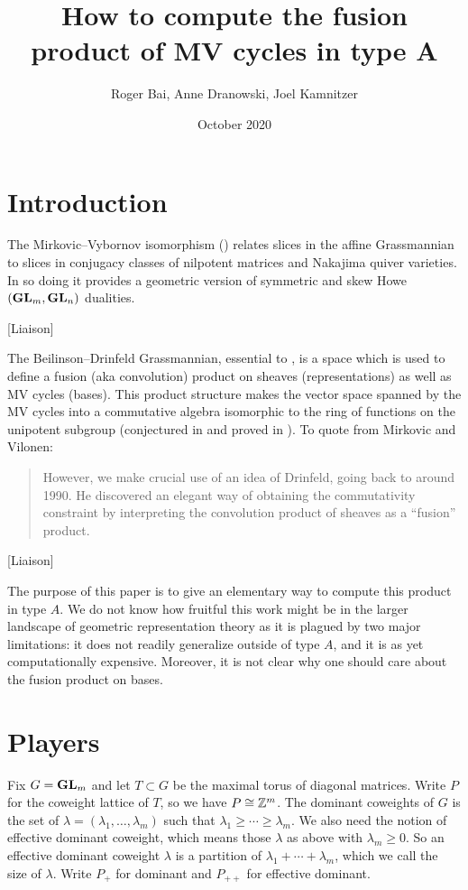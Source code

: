\documentclass[draft]{article}
\title{How to compute the fusion product of MV cycles in type A}
\author{Roger Bai, Anne Dranowski, Joel Kamnitzer}
\date{October 2020}
\begin{document}
\maketitle

\section{Introduction}
% 
The Mirkovic--Vybornov isomorphism (\cite{mirkovic2007quiver,mirkovic2019comparison}) relates slices in the affine Grassmannian to slices in conjugacy classes of nilpotent matrices and Nakajima quiver varieties. In so doing it provides a geometric version of symmetric and skew Howe $({\mathbf{GL}}_m,{\mathbf{GL}}_n)$ dualities. 
% 

[Liaison]

The Beilinson--Drinfeld Grassmannian, essential to \cite{mirkovic2007geometric}, is a space which is used to define a fusion (aka convolution) product on sheaves (representations) as well as MV cycles (bases). 
% 
This product structure makes the vector space spanned by the MV cycles into a commutative algebra isomorphic to the ring of functions on the unipotent subgroup (conjectured in \cite{anderson2003polytope} and proved in \cite{baumann2019mirkovic}). %
% 
To quote from Mirkovic and Vilonen:
\begin{quotation}
    However, we make crucial use of an idea of Drinfeld, going back to around 1990. He discovered an elegant way of obtaining the commutativity constraint by interpreting the convolution product of sheaves as a ``fusion'' product.
\end{quotation}
% 
[Liaison]

The purpose of this paper is to give an elementary way to compute this product in type $A$. We do not know how fruitful this work might be in the larger landscape of geometric representation theory as it is plagued by two major limitations: it does not readily generalize outside of type $A$, and it is as yet computationally expensive. 
% 
Moreover, it is not clear why one should care about the fusion product on bases.     

\section{Players}

Fix $G = {\mathbf{GL}}_m$ and let $T\subset G$ be the maximal torus of diagonal matrices. 
Write $P$ for the coweight lattice of $T$, so we have $P\cong \mathbb Z^m$.  The dominant coweights of $ G $ is the set of $ \lambda = (\lambda_1, \dots, \lambda_m) $ such that $ \lambda_1 \ge \cdots \ge \lambda_m$.  We also need the notion of effective dominant coweight, 
which means those $ \lambda $ as above with $ \lambda_m \ge 0$.  So an effective dominant coweight $ \lambda $ is a partition of $ \lambda_1 + \cdots + \lambda_m$, which we call the size of $ \lambda$. Write $P_+$ for dominant and $P_{++}$ for effective dominant. 
\end{document}
